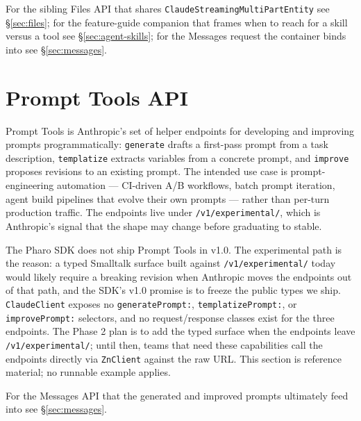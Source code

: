 \documentclass[a4paper,10pt,fleqn]{article}
\newcommand{\cls}[1]{\texttt{#1}}
\begin{document}
For the sibling Files API that shares \cls{ClaudeStreamingMultiPartEntity}
see \S\ref{sec:files}; for the feature-guide companion that frames
when to reach for a skill versus a tool see \S\ref{sec:agent-skills};
for the Messages request the container binds into see
\S\ref{sec:messages}.

\medskip
{}

\section{Prompt Tools API}
\label{sec:prompt-tools}

Prompt Tools is Anthropic's set of helper endpoints for developing
and improving prompts programmatically: \texttt{generate} drafts a
first-pass prompt from a task description, \texttt{templatize}
extracts variables from a concrete prompt, and \texttt{improve}
proposes revisions to an existing prompt.  The intended use case is
prompt-engineering automation --- CI-driven A/B workflows, batch
prompt iteration, agent build pipelines that evolve their own
prompts --- rather than per-turn production traffic.  The endpoints
live under \texttt{/v1/experimental/}, which is Anthropic's signal
that the shape may change before graduating to stable.

The Pharo SDK does not ship Prompt Tools in v1.0.  The experimental
path is the reason: a typed Smalltalk surface built against
\texttt{/v1/experimental/} today would likely require a breaking
revision when Anthropic moves the endpoints out of that path, and
the SDK's v1.0 promise is to freeze the public types we ship.
\cls{ClaudeClient} exposes no \texttt{generatePrompt:},
\texttt{templatizePrompt:}, or \texttt{improvePrompt:} selectors,
and no request/response classes exist for the three endpoints.
The Phase 2 plan is to add the typed surface when the endpoints
leave \texttt{/v1/experimental/}; until then, teams that need these
capabilities call the endpoints directly via \texttt{ZnClient}
against the raw URL.  This section is reference material; no
runnable example applies.

For the Messages API that the generated and improved prompts
ultimately feed into see \S\ref{sec:messages}.

\medskip
{}
\end{document}
